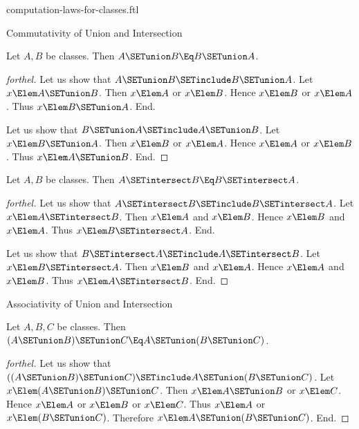 \documentclass{stex}
\begin{document}
\begin{smodule}{computation-laws-for-classes.ftl}

\begin{sfragment}{Commutativity of Union and Intersection}
  \begin{proposition}[forthel]
    Let $A, B$ be classes.
    Then $A \SETunion B \Eq B \SETunion A$.
  \end{proposition}
  \begin{proof}[forthel]
    Let us show that $A \SETunion B \SETinclude B \SETunion A$.
      Let $x \Elem A \SETunion B$.
      Then $x \Elem A$ or $x \Elem B$.
      Hence $x \Elem B$ or $x \Elem A$.
      Thus $x \Elem B \SETunion A$.
    End.

    Let us show that $B \SETunion A \SETinclude A \SETunion B$.
      Let $x \Elem B \SETunion A$.
      Then $x \Elem B$ or $x \Elem A$.
      Hence $x \Elem A$ or $x \Elem B$.
      Thus $x \Elem A \SETunion B$.
    End.
  \end{proof}

  \begin{proposition}[forthel]
    Let $A, B$ be classes.
    Then $A \SETintersect B \Eq B \SETintersect A$.
  \end{proposition}
  \begin{proof}[forthel]
    Let us show that $A \SETintersect B \SETinclude B \SETintersect A$.
      Let $x \Elem A \SETintersect B$.
      Then $x \Elem A$ and $x \Elem B$.
      Hence $x \Elem B$ and $x \Elem A$.
      Thus $x \Elem B \SETintersect A$.
    End.

    Let us show that $B \SETintersect A \SETinclude A \SETintersect B$.
      Let $x \Elem B \SETintersect A$.
      Then $x \Elem B$ and $x \Elem A$.
      Hence $x \Elem A$ and $x \Elem B$.
      Thus $x \Elem A \SETintersect B$.
    End.
  \end{proof}
\end{sfragment}

\begin{sfragment}{Associativity of Union and Intersection}
  \begin{proposition}[forthel]
    Let $A, B, C$ be classes.
    Then $(A \SETunion B) \SETunion C \Eq A \SETunion (B \SETunion C)$.
  \end{proposition}
  \begin{proof}[forthel]
    Let us show that $((A \SETunion B) \SETunion C) \SETinclude A \SETunion (B \SETunion C)$. %
      Let $x \Elem (A \SETunion B) \SETunion C$.
      Then $x \Elem A \SETunion B$ or $x \Elem C$.
      Hence $x \Elem A$ or $x \Elem B$ or $x \Elem C$.
      Thus $x \Elem A$ or $x \Elem (B \SETunion C)$.
      Therefore $x \Elem A \SETunion (B \SETunion C)$.
    End.


\end{proof}
\end{sfragment}
\end{smodule}
\end{document}
